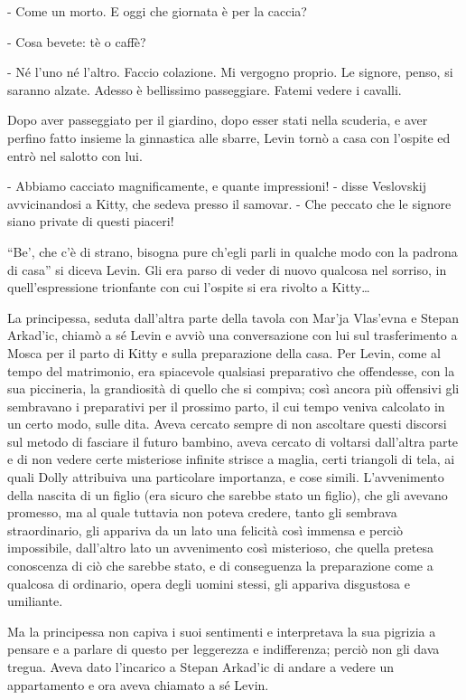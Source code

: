 - Come un morto. E oggi che giornata è per la caccia? 

- Cosa bevete: tè o caffè? 

- Né l'uno né l'altro. Faccio colazione. Mi vergogno proprio. Le signore, penso, si saranno alzate. Adesso è bellissimo passeggiare. Fatemi vedere i cavalli. 

Dopo aver passeggiato per il giardino, dopo esser stati nella scuderia, e aver perfino fatto insieme la ginnastica alle sbarre, Levin tornò a casa con l'ospite ed entrò nel salotto con lui. 

- Abbiamo cacciato magnificamente, e quante impressioni! - disse Veslovskij avvicinandosi a Kitty, che sedeva presso il samovar. - Che peccato che le signore siano private di questi piaceri! 

``Be', che c'è di strano, bisogna pure ch'egli parli in qualche modo con la padrona di casa'' si diceva Levin. Gli era parso di veder di nuovo qualcosa nel sorriso, in quell'espressione trionfante con cui l'ospite si era rivolto a Kitty\ldots{} 

La principessa, seduta dall'altra parte della tavola con Mar'ja Vlas'evna e Stepan Arkad'ic, chiamò a sé Levin e avviò una conversazione con lui sul trasferimento a Mosca per il parto di Kitty e sulla preparazione della casa. Per Levin, come al tempo del matrimonio, era spiacevole qualsiasi preparativo che offendesse, con la sua piccineria, la grandiosità di quello che si compiva; così ancora più offensivi gli sembravano i preparativi per il prossimo parto, il cui tempo veniva calcolato in un certo modo, sulle dita. Aveva cercato sempre di non ascoltare questi discorsi sul metodo di fasciare il futuro bambino, aveva cercato di voltarsi dall'altra parte e di non vedere certe misteriose infinite strisce a maglia, certi triangoli di tela, ai quali Dolly attribuiva una particolare importanza, e cose simili. L'avvenimento della nascita di un figlio (era sicuro che sarebbe stato un figlio), che gli avevano promesso, ma al quale tuttavia non poteva credere, tanto gli sembrava straordinario, gli appariva da un lato una felicità così immensa e perciò impossibile, dall'altro lato un avvenimento così misterioso, che quella pretesa conoscenza di ciò che sarebbe stato, e di conseguenza la preparazione come a qualcosa di ordinario, opera degli uomini stessi, gli appariva disgustosa e umiliante. 

Ma la principessa non capiva i suoi sentimenti e interpretava la sua pigrizia a pensare e a parlare di questo per leggerezza e indifferenza; perciò non gli dava tregua. Aveva dato l'incarico a Stepan Arkad'ic di andare a vedere un appartamento e ora aveva chiamato a sé Levin. 

